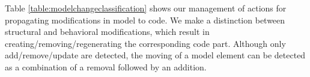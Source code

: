 \noindent
{}
Table \ref{table:modelchangeclassification} shows our management of actions for propagating modifications in model to code.
We make a distinction between structural and behavioral modifications, which result in creating/removing/regenerating the corresponding code part.
Although only add/remove/update are detected, the moving of a model element can be detected as a combination of a removal followed by an addition.  



